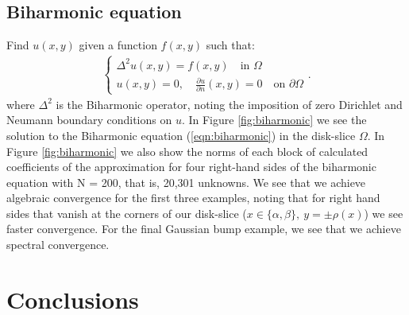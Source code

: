\documentclass[11pt, oneside]{article}   	%
\begin{document}
\subsection{Biharmonic equation}

Find \(u(x,y)\) given a function \(f(x,y)\) such that:
\begin{align}
	\begin{cases}
    		\Delta^2 u(x,y) = f(x,y) \quad \text{in } \Omega \\
		u(x,y) = 0, \quad \frac{\partial u}{\partial n}(x,y) = 0 \quad \text{on } \partial \Omega
	\end{cases}.
	\label{eqn:biharmonic}
\end{align}
where $\Delta^2$ is the Biharmonic operator, noting the imposition of zero Dirichlet and Neumann boundary conditions on $u$. In Figure \ref{fig:biharmonic} we see the solution to the Biharmonic equation (\ref{eqn:biharmonic}) in the disk-slice $\Omega$. In Figure \ref{fig:biharmonic} we also show the norms of each block of calculated coefficients of the approximation for four right-hand sides of the biharmonic equation with N = 200, that is, 20,301 unknowns.  We see that we achieve algebraic convergence for the first three examples, noting that for right hand sides that vanish at the corners of our disk-slice ($x\in\{\alpha,\beta\}, \: y = \pm \rho(x)$) we see faster convergence. For the final Gaussian bump example, we see that we achieve spectral convergence.


%
\section{Conclusions}
\end{document}
